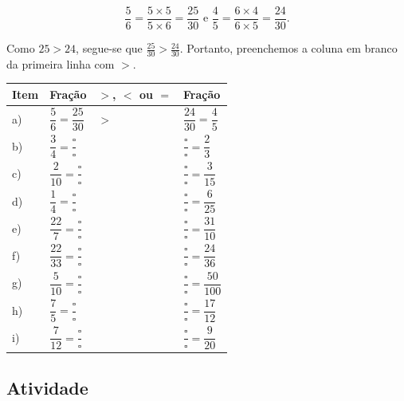 $$\frac{5}{6} = \frac{5 \times 5}{5 \times 6} = \frac{25}{30} \text{ e } \frac{4}{5} = \frac{6 \times 4}{6 \times 5} = \frac{24}{30}.$$

Como $25 > 24$, segue-se que $\frac{25}{30} > \frac{24}{30}$. Portanto, preenchemos a coluna em branco da primeira linha com $>$.


\begin{center}
  \begin{longtable}{|	m{}|m{}|m{}|m{}|}
    \hline
     Item &  Fração &  $>$, $<$ ou $=$ &  Fração \\
    \hline \hline
     a) & \parbox[b][1.2cm][c]{3cm}{ $\dfrac{5}{6} = \dfrac{25}{30}$ } &   $>$&  $\dfrac{24}{30} = \dfrac{4}{5}$ \\
    \hline
     b) & \parbox[b][1.2cm][c]{3cm}{ $\dfrac{3}{4} = \dfrac{\square}{\square}$} &   &  $\dfrac{\square}{\square} = \dfrac{2}{3}$ \\
    \hline
     c) &  \parbox[b][1.2cm][c]{3cm}{$\dfrac{2}{10} = \dfrac{\square}{\square}$} &   &  $\dfrac{\square}{\square} = \dfrac{3}{15}$ \\
    \hline
     d) & \parbox[b][1.2cm][c]{3cm}{ $\dfrac{1}{4} = \dfrac{\square}{\square}$} &   &  $\dfrac{\square}{\square} = \dfrac{6}{25}$ \\
    \hline
     e) & \parbox[b][1.2cm][c]{3cm}{ $\dfrac{22}{7} = \dfrac{\square}{\square}$} &  &  $\dfrac{\square}{\square} = \dfrac{31}{10}$ \\
    \hline
     f) & \parbox[b][1.2cm][c]{3cm}{ $\dfrac{22}{33} = \dfrac{\square}{\square}$} &   &  $\dfrac{\square}{\square} = \dfrac{24}{36}$ \\
    \hline
     g) & \parbox[b][1.2cm][c]{3cm}{ $\dfrac{5}{10} = \dfrac{\square}{\square}$} &   &  $\dfrac{\square}{\square} = \dfrac{50}{100}$ \\
    \hline
     h) & \parbox[b][1.2cm][c]{3cm}{ $\dfrac{7}{5} = \dfrac{\square}{\square}$} &  &  $\dfrac{\square}{\square} = \dfrac{17}{12}$ \\
    \hline
     i) & \parbox[b][1.2cm][c]{3cm}{ $\dfrac{7}{12} = \dfrac{\square}{\square}$} &  &  $\dfrac{\square}{\square} = \dfrac{9}{20}$ \\
    \hline
  \end{longtable}
\end{center}


\subsection{Atividade}



